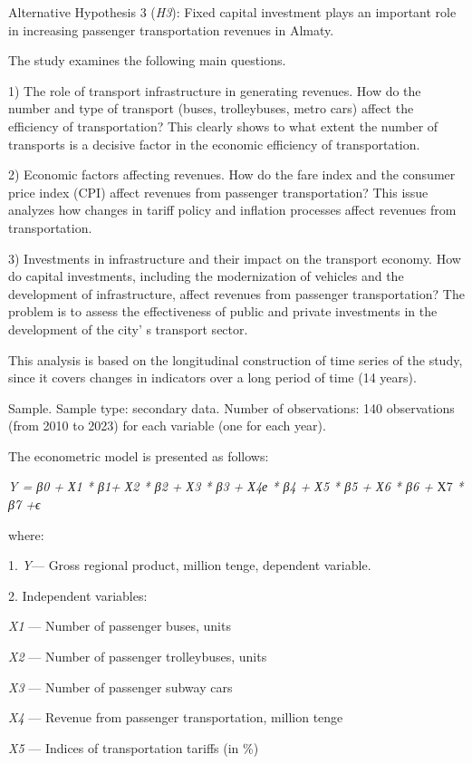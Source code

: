 Alternative Hypothesis 3 (\emph{H3}): Fixed capital investment plays an
important role in increasing passenger transportation revenues in
Almaty.

The study examines the following main questions.

1) The role of transport infrastructure in generating revenues. How do
the number and type of transport (buses, trolleybuses, metro cars)
affect the efficiency of transportation? This clearly shows to what
extent the number of transports is a decisive factor in the economic
efficiency of transportation.

2) Economic factors affecting revenues. How do the fare index and the
consumer price index (CPI) affect revenues from passenger
transportation? This issue analyzes how changes in tariff policy and
inflation processes affect revenues from transportation.

3) Investments in infrastructure and their impact on the transport
economy. How do capital investments, including the modernization of
vehicles and the development of infrastructure, affect revenues from
passenger transportation? The problem is to assess the effectiveness of
public and private investments in the development of the
city' s transport sector.

This analysis is based on the longitudinal construction of time series
of the study, since it covers changes in indicators over a long period
of time (14 years).

Sample. Sample type: secondary data. Number of observations: 140
observations (from 2010 to 2023) for each variable (one for each year).

The econometric model is presented as follows:

\emph{Y = β0 + Х1 * β1+ Х2 * β2 + Х3 * β3 + Х4е * β4 + Х5 * β5 + Х6 * β6
+} Х7 \emph{* β7 +ϵ}

where:

1. \emph{Y}--- Gross regional product, million tenge, dependent
variable.

2. Independent variables:

\emph{X1} --- Number of passenger buses, units

\emph{X2} --- Number of passenger trolleybuses, units

\emph{X3} --- Number of passenger subway cars

\emph{X4} --- Revenue from passenger transportation, million tenge

\emph{X5} --- Indices of transportation tariffs (in \%)

